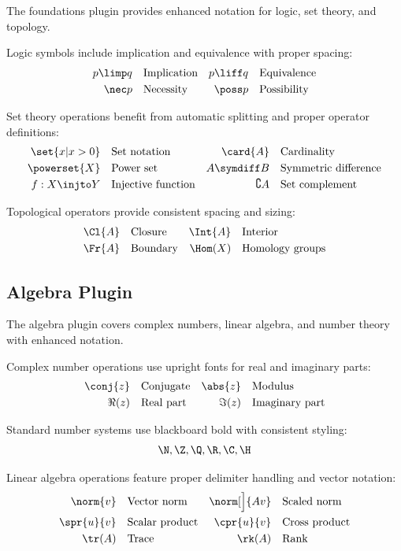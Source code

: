 \documentclass{article}
\begin{document}
The foundations plugin provides enhanced notation for logic, set theory, and topology.

Logic symbols include implication and equivalence with proper spacing:
\begin{align*}
p \limp q &\quad\text{Implication} &
p \liff q &\quad\text{Equivalence} \\
\nec p &\quad\text{Necessity} &
\poss p &\quad\text{Possibility}
\end{align*}

Set theory operations benefit from automatic splitting and proper operator definitions:
\begin{align*}
\set{x | x > 0} &\quad\text{Set notation} &
\card{A} &\quad\text{Cardinality} \\
\powerset{X} &\quad\text{Power set} &
A \symdiff B &\quad\text{Symmetric difference} \\
f: X \injto Y &\quad\text{Injective function} &
\complement{A} &\quad\text{Set complement}
\end{align*}

Topological operators provide consistent spacing and sizing:
\begin{align*}
\Cl{A} &\quad\text{Closure} &
\Int{A} &\quad\text{Interior} \\
\Fr{A} &\quad\text{Boundary} &
\Hom(X) &\quad\text{Homology groups}
\end{align*}

\subsection{Algebra Plugin}

The algebra plugin covers complex numbers, linear algebra, and number theory with enhanced notation.

Complex number operations use upright fonts for real and imaginary parts:
\begin{align*}
\conj{z} &\quad\text{Conjugate} &
\abs{z} &\quad\text{Modulus} \\
\Re(z) &\quad\text{Real part} &
\Im(z) &\quad\text{Imaginary part}
\end{align*}

Standard number systems use blackboard bold with consistent styling:
\[
\N, \Z, \Q, \R, \C, \H
\]

Linear algebra operations feature proper delimiter handling and vector notation:
\begin{align*}
\norm{v} &\quad\text{Vector norm} &
\norm[\Big]{Av} &\quad\text{Scaled norm} \\
\spr{u}{v} &\quad\text{Scalar product} &
\cpr{u}{v} &\quad\text{Cross product} \\
\tr(A) &\quad\text{Trace} &
\rk(A) &\quad\text{Rank}
\end{align*}
\end{document}
